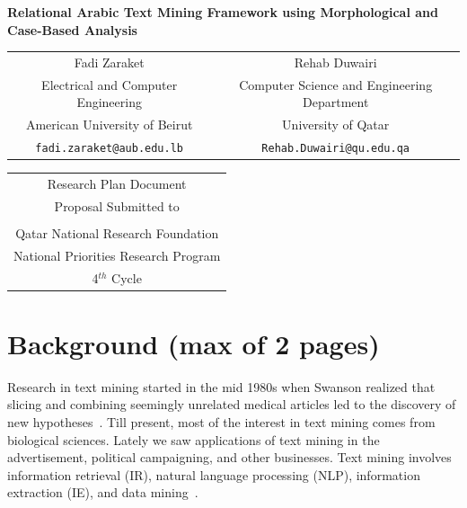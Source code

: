 \documentclass[12pt]{article}
\begin{document}
\pagestyle{fancy}
\chead{}

\cfoot{}
\renewcommand{\footrulewidth}{0.2pt}
\renewcommand{\headrulewidth}{0.2pt}


\begin{center}
{\Large \bf Relational Arabic Text Mining Framework using 
    Morphological
    and Case-Based Analysis }

\vspace{1.5in}

\renewcommand{\arraystretch}{.6}
\begin{tabular}{cc}
Fadi Zaraket & Rehab Duwairi \\
Electrical and Computer Engineering &  Computer Science and Engineering Department \\
American University of Beirut & University of Qatar \\
{\tt fadi.zaraket@aub.edu.lb} & {\tt Rehab.Duwairi@qu.edu.qa}
\end{tabular}

\vspace{1.5in}

\renewcommand{\arraystretch}{.6}
\begin{tabular}{c}
{\small Research Plan Document } \\
{\small Proposal Submitted to }\\
\\
    Qatar National Research Foundation \\
    National Priorities Research Program \\
    4$^{th}$ Cycle 
\end{tabular}
\vspace{.5in}

\date{\today}
\pagebreak

\end{center}

\section{Background (max of 2 pages)}
\label{s:background}

Research in text mining started in the mid 1980s when Swanson 
realized that slicing and combining seemingly unrelated medical 
articles led to the discovery of new 
hypotheses~\cite{JNi06}.
Till present, most of the interest in text mining comes 
from biological sciences.
Lately we saw applications of text mining in the advertisement, 
political campaigning, and other businesses.
Text mining involves information retrieval (IR), natural language 
processing (NLP), information extraction (IE), 
and data mining~\cite{ASr09}.
\end{document}
